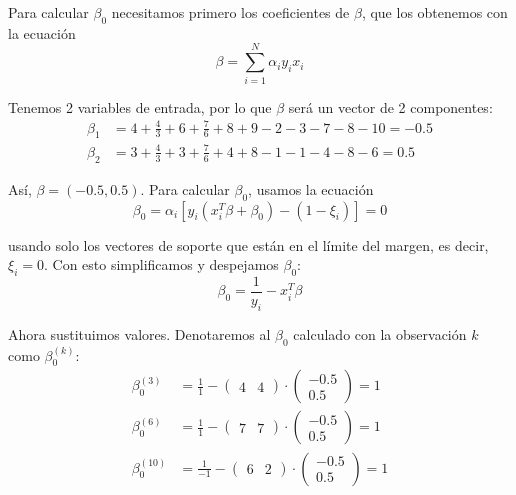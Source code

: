\begin{example}
Para calcular $\beta_0$ necesitamos primero los coeficientes de $\beta$, que los obtenemos con la ecuación 
\begin{equation}
\beta = \sum_{i=1}^N \alpha_i y_i x_i
\end{equation}

\noindent Tenemos 2 variables de entrada, por lo que $\beta$ será un vector de 2 componentes: 
\begin{align*}
\beta_1 &= 4 + \frac{4}{3} + 6 + \frac{7}{6} + 8 + 9 - 2 - 3 - 7 - 8 - 10 = -0.5 \\
\beta_2 &= 3 + \frac{4}{3} + 3 + \frac{7}{6} + 4 + 8 - 1 - 1 - 4 - 8 - 6 = 0.5
\end{align*} 

\noindent Así, $\beta = (-0.5, 0.5)$. Para calcular $\beta_0$, usamos la ecuación
\begin{equation}
\beta_0 = \alpha_i [y_i(x_i^T \beta + \beta_0) - (1 - \xi_i)] = 0
\end{equation}

usando solo los vectores de soporte que están en el límite del margen, es decir, $\xi_i = 0$. Con esto simplificamos y despejamos $\beta_0$:
\begin{equation}
\beta_0 = \frac{1}{y_i} - x_i^T \beta
\end{equation}

\noindent Ahora sustituimos valores. Denotaremos al $\beta_0$ calculado con la observación $k$ como $\beta_{0}^{(k)}$:
\begin{align}
\beta_0^{(3)} &= \frac{1}{1} - \begin{pmatrix} 4 & 4 \end{pmatrix} \cdot \begin{pmatrix} -0.5 \\ 0.5 \end{pmatrix} = 1 \\
\beta_0^{(6)} &= \frac{1}{1} - \begin{pmatrix} 7 & 7 \end{pmatrix} \cdot \begin{pmatrix} -0.5 \\ 0.5 \end{pmatrix} = 1 \\
\beta_0^{(10)} &= \frac{1}{-1} - \begin{pmatrix} 6 & 2 \end{pmatrix} \cdot \begin{pmatrix} -0.5 \\ 0.5 \end{pmatrix} = 1
\end{align}


\end{example}
